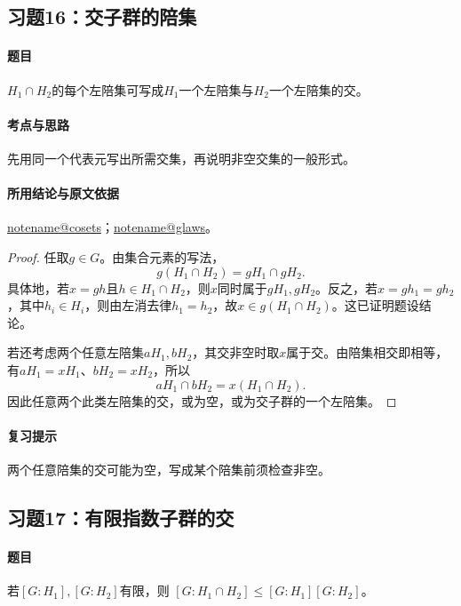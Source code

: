 \documentclass[UTF8,a4paper,11pt,fontset=windows]{ctexart}
\makeatletter
\newcommand{\noteref}[1]{\hyperref[note:#1]{\csname notename@#1\endcsname}}
\newcommand{\exref}[2]{\hyperref[ex:#1:#2]{第#1章习题#2}}
\makeatother
\begin{document}
\subsection{习题16：\texorpdfstring{交子群的陪集}{交子群的陪集}}
\label{ex:2:16}

\paragraph{题目}
$H_1\cap H_2$的每个左陪集可写成$H_1$一个左陪集与$H_2$一个左陪集的交。

\paragraph{考点与思路}
先用同一个代表元写出所需交集，再说明非空交集的一般形式。

\paragraph{所用结论与原文依据}
\noteref{cosets}；\noteref{glaws}。


\begin{proof}
任取$g\in G$。由集合元素的写法，
\[
g(H_1\cap H_2)=gH_1\cap gH_2.
\]
具体地，若$x=gh$且$h\in H_1\cap H_2$，则$x$同时属于$gH_1,gH_2$。反之，若$x=gh_1=gh_2$，其中$h_i\in H_i$，则由左消去律$h_1=h_2$，故$x\in g(H_1\cap H_2)$。这已证明题设结论。

若还考虑两个任意左陪集$aH_1,bH_2$，其交非空时取$x$属于交。由陪集相交即相等，有$aH_1=xH_1$、$bH_2=xH_2$，所以
\[
aH_1\cap bH_2=x(H_1\cap H_2).
\]
因此任意两个此类左陪集的交，或为空，或为交子群的一个左陪集。
\end{proof}

\paragraph{复习提示}
两个任意陪集的交可能为空，写成某个陪集前须检查非空。


\subsection{习题17：\texorpdfstring{有限指数子群的交}{有限指数子群的交}}
\label{ex:2:17}

\paragraph{题目}
若$[G:H_1],[G:H_2]$有限，则
$[G:H_1\cap H_2]\leq[G:H_1][G:H_2]$。
\end{document}
